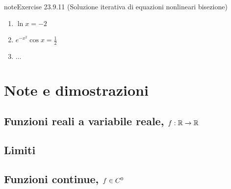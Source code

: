\documentclass[letterpaper,10pt,italian]{jupyterBook}
\begin{document}
\begin{sphinxadmonition}{note}{Exercise 23.9.11 (Soluzione iterativa di equazioni nonlineari \sphinxhyphen{} bisezione)}


\begin{enumerate}
%
\item {} 
\sphinxAtStartPar
\(\ln x = - 2\)

\item {} 
\sphinxAtStartPar
\(e^{-x^2} \cos x = \frac{1}{2}\)

\item {} 
\sphinxAtStartPar
\(\dots\)

\end{enumerate}
\end{sphinxadmonition}





\sphinxstepscope


\section{Note e dimostrazioni}
\label{\detokenize{ch/infinitesimal_calculus/analysis-notes:note-e-dimostrazioni}}\label{\detokenize{ch/infinitesimal_calculus/analysis-notes:infinitesimal-calculus-analysis-notes}}\label{\detokenize{ch/infinitesimal_calculus/analysis-notes::doc}}

\subsection{Funzioni reali a variabile reale, \protect\(f: \mathbb{R} \rightarrow \mathbb{R}\protect\)}
\label{\detokenize{ch/infinitesimal_calculus/analysis-notes:funzioni-reali-a-variabile-reale-f-mathbb-r-rightarrow-mathbb-r}}

\subsection{Limiti}
\label{\detokenize{ch/infinitesimal_calculus/analysis-notes:limiti}}

\subsection{Funzioni continue, \protect\(f \in C^0\protect\)}
\label{\detokenize{ch/infinitesimal_calculus/analysis-notes:funzioni-continue-f-in-c-0}}
\end{document}

